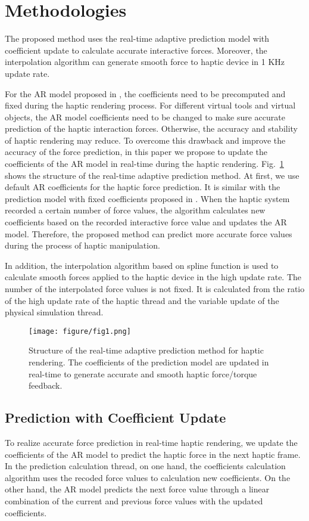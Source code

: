 \documentclass[10pt,journal,cspaper,compsoc]{IEEEtran}
\begin{document}
\section{Methodologies}
The proposed method uses the real-time adaptive prediction model with coefficient update to calculate accurate interactive forces. Moreover, the interpolation algorithm can generate smooth force to haptic device in 1 KHz update rate. 

For the AR model proposed in \cite{no20}, the coefficients need to be precomputed and fixed during the haptic rendering process. For different virtual tools and virtual objects, the AR model coefficients need to be changed to make sure accurate prediction of the haptic interaction forces. Otherwise, the accuracy and stability of haptic rendering may reduce. To overcome this drawback and improve the accuracy of the force prediction, in this paper we propose to update the coefficients of the AR model in real-time during the haptic rendering. Fig.~\ref{fig:pipeline} shows the structure of the real-time adaptive prediction method. At first, we use default AR coefficients for the haptic force prediction. It is similar with the prediction model with fixed coefficients proposed in \cite{no20}. When the haptic system recorded a certain number of force values, the algorithm calculates new coefficients based on the recorded interactive force value and updates the AR model. Therefore, the proposed method can predict more accurate force values during the process of haptic manipulation. 

In addition, the interpolation algorithm based on spline function is used to calculate smooth forces applied to the haptic device in the high update rate. The number of the interpolated force values is not fixed. It is calculated from the ratio of the high update rate of the haptic thread and the variable update of the physical simulation thread.

\begin{figure}[!t]
	\centering
	\texttt{[image: figure/fig1.png]}
	\caption{Structure of the real-time adaptive prediction method for haptic rendering. The coefficients of the prediction model are updated in real-time to generate accurate and smooth haptic force/torque feedback.}
	\label{fig:pipeline}
\end{figure}




\subsection{Prediction with Coefficient Update}
\label{PredictionSection}
To realize accurate force prediction in real-time haptic rendering, we update the coefficients of the AR model to predict the haptic force in the next haptic frame. In the prediction calculation thread, on one hand, the coefficients calculation algorithm uses the recoded force values to calculation new coefficients. On the other hand, the AR model predicts the next force value through a linear combination of the current and previous force values with the updated coefficients. 
\end{document}
